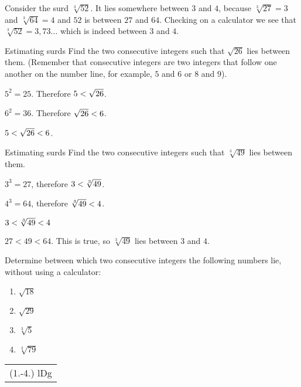 


Consider the surd $\sqrt[3]{52}$. It lies somewhere between $3$ and $4$, because $\sqrt[3]{27}=3$ and $\sqrt[3]{64}=4$ and $52$ is between $27$ and $64$. Checking on a calculator we see that $\sqrt[3]{52}=3,73\ldots$ which is indeed between $3$ and $4$.\par 

\begin{wex}{Estimating surds}
{%
Find the two consecutive integers such that $\sqrt{26}$ lies between them.
(Remember that consecutive integers are two integers that follow one
another on the number line, for example, $5$ and $6$ or $8$ and $9$).
}
{%

${5}^{2}=25$. Therefore $5<{}\sqrt{26}$.

${6}^{2}=36$. 
Therefore $\sqrt{26}<{}6$.

$5<{}\sqrt{26}<{}6$. 
}
\end{wex}


\begin{wex}{Estimating surds}
{%
Find the two consecutive integers such that $\sqrt[3]{49}$ lies between them.
}
{%

   ${3}^{3}=27$, therefore $3<{}\sqrt[3]{49}$.

 ${4}^{3}=64$, therefore $\sqrt[3]{49}<{}4$. 

$3<{}\sqrt[3]{49}<{}4$

$27<49<64$. This is true, so $\sqrt[3]{49}$ lies between $3$ and $4$.
}
\end{wex}

\begin{exercises}{}
 {
Determine between which two consecutive integers the following numbers lie, without using a calculator:
\begin{enumerate}[itemsep=5pt, label=\textbf{\arabic*}. ]
\item $\sqrt{18}$
\item $\sqrt{29}$
\item $\sqrt[3]{5}$
\item $\sqrt[3]{79}$

\end{enumerate}
\practiceinfo 
\par 
 \par \begin{tabular}[h]{c}
 (1.-4.) lDg \end{tabular}
}
\end{exercises}



